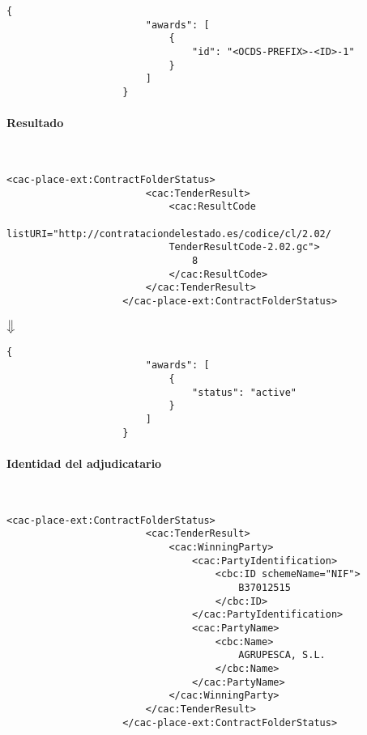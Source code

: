                 \begin{lstlisting}[language=lJSON]
                    {
                        "awards": [
                            {
                                "id": "<OCDS-PREFIX>-<ID>-1"
                            }
                        ]
                    }
                \end{lstlisting}
\newpage
            \paragraph{Resultado} \mbox{}\\
                \begin{lstlisting}[language=lXML]
                    <cac-place-ext:ContractFolderStatus>
                        <cac:TenderResult>
                            <cac:ResultCode
                            listURI="http://contrataciondelestado.es/codice/cl/2.02/
                            TenderResultCode-2.02.gc">
                                8
                            </cac:ResultCode>
                        </cac:TenderResult>
                    </cac-place-ext:ContractFolderStatus>
                \end{lstlisting}
                
                \begin{center}
                    $\big\Downarrow$
                \end{center}
                
                \begin{lstlisting}[language=lJSON]
                    {
                        "awards": [
                            {
                                "status": "active"
                            }
                        ]
                    }
                \end{lstlisting}
            
            \paragraph{Identidad del adjudicatario} \mbox{}\\
                \begin{lstlisting}[language=lXML]
                    <cac-place-ext:ContractFolderStatus>
                        <cac:TenderResult>
                            <cac:WinningParty>
                                <cac:PartyIdentification>
                                    <cbc:ID schemeName="NIF">
                                        B37012515
                                    </cbc:ID>
                                </cac:PartyIdentification>
                                <cac:PartyName>
                                    <cbc:Name>
                                        AGRUPESCA, S.L.
                                    </cbc:Name>
                                </cac:PartyName>
                            </cac:WinningParty>
                        </cac:TenderResult>
                    </cac-place-ext:ContractFolderStatus>
                \end{lstlisting}
                
